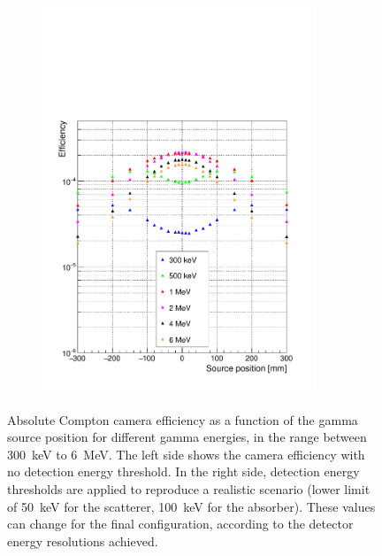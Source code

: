 \begin{figure} [!hbtp]
\begin{subfigure}[b]{.5\textwidth}
\includegraphics[width=0.9\textwidth]{03_GraphicFiles/chapter4_HTsimu/new/EffVSpos_CutSingle_simple.pdf}
\caption{}
\label{chap4::fig::effPos_Cut}
\end{subfigure}
\caption{Absolute Compton camera efficiency as a function of the gamma source position for different gamma energies, in the range between 300~keV to 6~MeV. The left side shows the camera efficiency with no detection energy threshold. In the right side, detection energy thresholds are applied to reproduce a realistic scenario (lower limit of 50~keV for the scatterer, 100~keV for the absorber). These values can change for the final configuration, according to the detector energy resolutions achieved.}
\label{chap4::fig::efficiency_study}
\end{figure}

